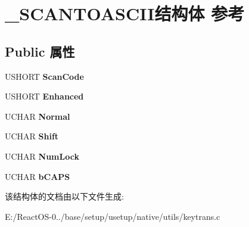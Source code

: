 \hypertarget{struct___s_c_a_n_t_o_a_s_c_i_i}{}\section{\+\_\+\+S\+C\+A\+N\+T\+O\+A\+S\+C\+I\+I结构体 参考}
\label{struct___s_c_a_n_t_o_a_s_c_i_i}
\subsection*{Public 属性}
\begin{DoxyCompactItemize}
\item 
\mbox{\label{struct___s_c_a_n_t_o_a_s_c_i_i_ad393e25629c6440c116464f84840e408}} 
U\+S\+H\+O\+RT {\bfseries Scan\+Code}
\item 
\mbox{\label{struct___s_c_a_n_t_o_a_s_c_i_i_a47cf28777b6ac9a91b5761d2cacb73e6}} 
U\+S\+H\+O\+RT {\bfseries Enhanced}
\item 
\mbox{\label{struct___s_c_a_n_t_o_a_s_c_i_i_af6a92623f40d5ce1a41be89af398940e}} 
U\+C\+H\+AR {\bfseries Normal}
\item 
\mbox{\label{struct___s_c_a_n_t_o_a_s_c_i_i_a9d17588751884637b5bfa2b729dc56b4}} 
U\+C\+H\+AR {\bfseries Shift}
\item 
\mbox{\label{struct___s_c_a_n_t_o_a_s_c_i_i_a85f228337438faeba680ff1a28445e15}} 
U\+C\+H\+AR {\bfseries Num\+Lock}
\item 
\mbox{\label{struct___s_c_a_n_t_o_a_s_c_i_i_abf57ae3716a120252567ad4517df19c5}} 
U\+C\+H\+AR {\bfseries b\+C\+A\+PS}
\end{DoxyCompactItemize}


该结构体的文档由以下文件生成\+:\begin{DoxyCompactItemize}
\item 
E\+:/\+React\+O\+S-\/0../base/setup/usetup/native/utils/keytrans.\+c\end{DoxyCompactItemize}
